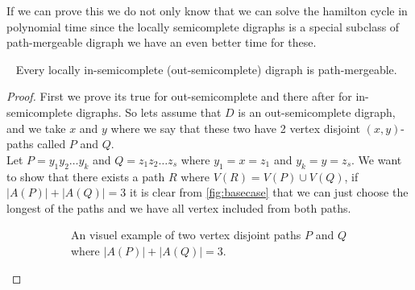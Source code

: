 If we can prove this we do not only know that we can solve the hamilton cycle in polynomial time since the locally semicomplete digraphs is a special subclass of path-mergeable digraph we have an even better time for these.
\begin{prop}~\cite{bangJGT20}
    Every locally in-semicomplete (out-semicomplete) digraph is path-mergeable.
\end{prop}
\begin{proof}
    First we prove its true for out-semicomplete and there after for in-semicomplete digraphs.
    So lets assume that $D$ is an out-semicomplete digraph, and we take $x$ and $y$ where we say that these two have 2 vertex disjoint $(x,y)$-paths called $P$ and $Q$.\\
    Let $P=y_1y_2\dots y_k$ and $Q=z_1z_2\dots z_s$ where $y_1=x=z_1$ and $y_k=y=z_s$. We want to show that there exists a path $R$ where $V(R)=V(P)\cup V(Q)$, if $|A(P)|+|A(Q)|=3$ it is clear from \autoref{fig:basecase} that we can just choose the longest of the paths and we have all vertex included from both paths.
    \begin{figure}
        \centering
        \begin{subfigure}{0.36\textwidth}
            \centering
            \caption{An visuel example of two vertex disjoint paths $P$ and $Q$ where $|A(P)|+|A(Q)|=3$.}
            \label{fig:basecase}
        \end{subfigure}\hfill
        \begin{subfigure}{0.60\textwidth}
            \centering
\end{subfigure}
\end{figure}
\end{proof}
